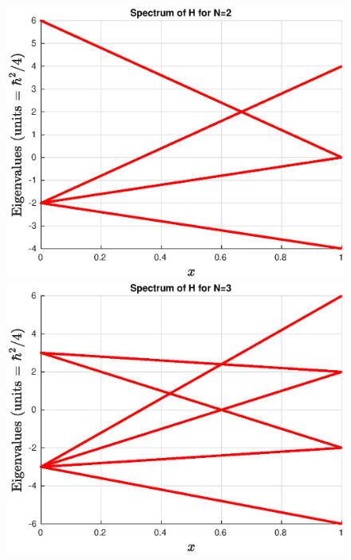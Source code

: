 \documentclass{article}
\theoremstyle{definition}
\begin{document}
\begin{enumerate}[label=(\alph*)]
	\begin{figure}[!htb]
		\centering
		\begin{minipage}{0.49\textwidth}
			\includegraphics[width=\textwidth]{2g.eps}
		\end{minipage}
		\begin{minipage}{0.49\textwidth}
			\includegraphics[width=\textwidth]{2g_N3.eps}
		\end{minipage}
		\begin{minipage}{0.49\textwidth}

\end{minipage}
\end{figure}
\end{enumerate}
\end{document}
